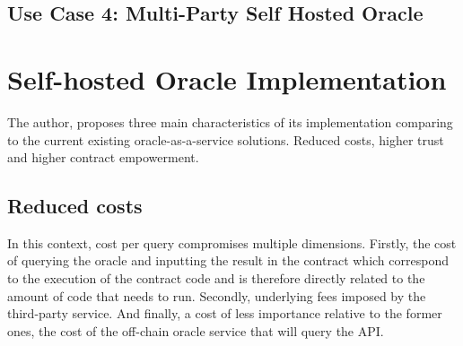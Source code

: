 
\subsection{Use Case 4: Multi-Party Self Hosted Oracle}




\section{Self-hosted Oracle Implementation}

The author, proposes three main characteristics of its implementation comparing to the current existing oracle-as-a-service solutions. Reduced costs, higher trust and higher contract empowerment.


\subsection{Reduced costs}

In this context, cost per query compromises multiple dimensions. Firstly, the cost of querying the oracle and inputting the result in the contract which correspond to the execution of the contract code and is therefore directly related to the amount of code that needs to run. Secondly, underlying fees imposed by the third-party service. And finally, a cost of less importance relative to the former ones, the cost of the off-chain oracle service that will query the API.

